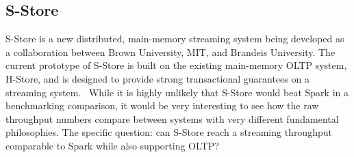 \subsection{S-Store}
S-Store is a new distributed, main-memory streaming system being developed as a collaboration between Brown University, MIT, and Brandeis University.  The current prototype of S-Store is built on the existing main-memory OLTP system, H-Store, and is designed to provide strong transactional guarantees on a streaming system.~\cite{hstore}  While it is highly unlikely that S-Store would beat Spark in a benchmarking comparison, it would be very interesting to see how the raw throughput numbers compare between systems with very different fundamental philosophies.  The specific question: can S-Store reach a streaming throughput comparable to Spark while also supporting OLTP?